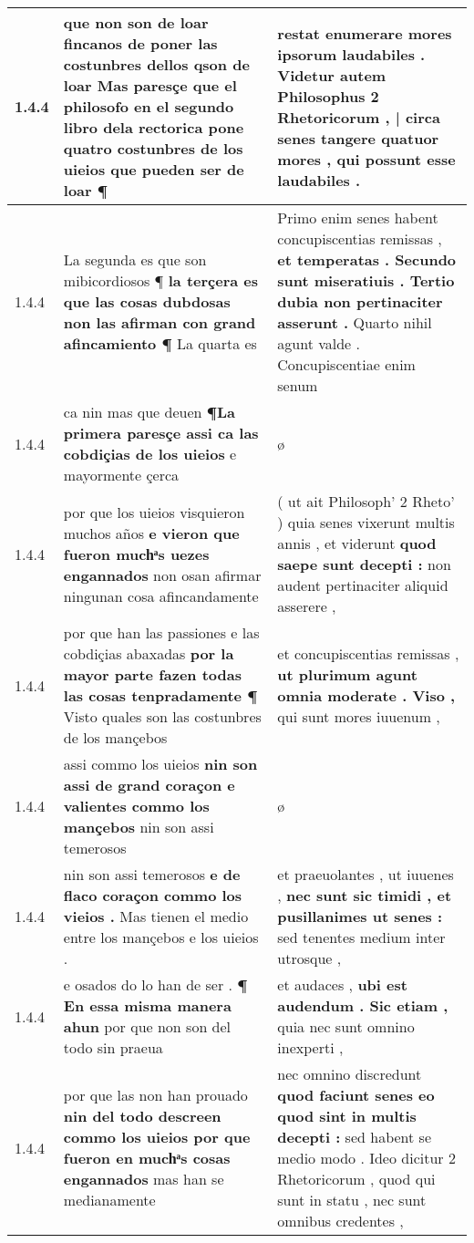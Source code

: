 \begin{tabular}{|p{1cm}|p{6.5cm}|p{6.5cm}|}
1.4.4 & que non son de loar fincanos de poner las costunbres dellos qson de loar \textbf{ Mas paresçe que el philosofo en el segundo libro dela rectorica pone quatro costunbres de los uieios } que pueden ser de loar ¶ & restat enumerare mores ipsorum laudabiles . \textbf{ Videtur autem Philosophus 2 Rhetoricorum , | circa senes tangere quatuor mores , } qui possunt esse laudabiles . \\\hline
1.4.4 & La segunda es que son mibicordiosos ¶ \textbf{ la terçera es que las cosas dubdosas non las afirman con grand afincamiento ¶ } La quarta es & Primo enim senes habent concupiscentias remissas , \textbf{ et temperatas . Secundo sunt miseratiuis . Tertio dubia non pertinaciter asserunt . } Quarto nihil agunt valde . Concupiscentiae enim senum \\\hline
1.4.4 & ca nin mas que deuen \textbf{ ¶La primera paresçe assi ca las cobdiçias de los uieios } e mayormente çerca & ø \\\hline
1.4.4 & por que los uieios visquieron muchos años \textbf{ e vieron que fueron muchͣs uezes engannados } non osan afirmar ningunan cosa afincandamente & ( ut ait Philosoph’ 2 Rheto’ ) quia senes vixerunt multis annis , et viderunt \textbf{ quod saepe sunt decepti : } non audent pertinaciter aliquid asserere , \\\hline
1.4.4 & por que han las passiones e las cobdiçias abaxadas \textbf{ por la mayor parte fazen todas las cosas tenpradamente ¶ } Visto quales son las costunbres de los mançebos & et concupiscentias remissas , \textbf{ ut plurimum agunt omnia moderate . Viso , } qui sunt mores iuuenum , \\\hline
1.4.4 & assi commo los uieios \textbf{ nin son assi de grand coraçon e valientes commo los mançebos } nin son assi temerosos & ø \\\hline
1.4.4 & nin son assi temerosos \textbf{ e de flaco coraçon commo los vieios . } Mas tienen el medio entre los mançebos e los uieios . & et praeuolantes , ut iuuenes , \textbf{ nec sunt sic timidi , et pusillanimes ut senes : } sed tenentes medium inter utrosque , \\\hline
1.4.4 & e osados do lo han de ser . \textbf{ ¶ En essa misma manera ahun } por que non son del todo sin praeua & et audaces , \textbf{ ubi est audendum . Sic etiam , } quia nec sunt omnino inexperti , \\\hline
1.4.4 & por que las non han prouado \textbf{ nin del todo descreen commo los uieios por que fueron en muchͣs cosas engannados } mas han se medianamente & nec omnino discredunt \textbf{ quod faciunt senes eo quod sint in multis decepti : } sed habent se medio modo . Ideo dicitur 2 Rhetoricorum , quod qui sunt in statu , nec sunt omnibus credentes , \\\hline

\end{tabular}
